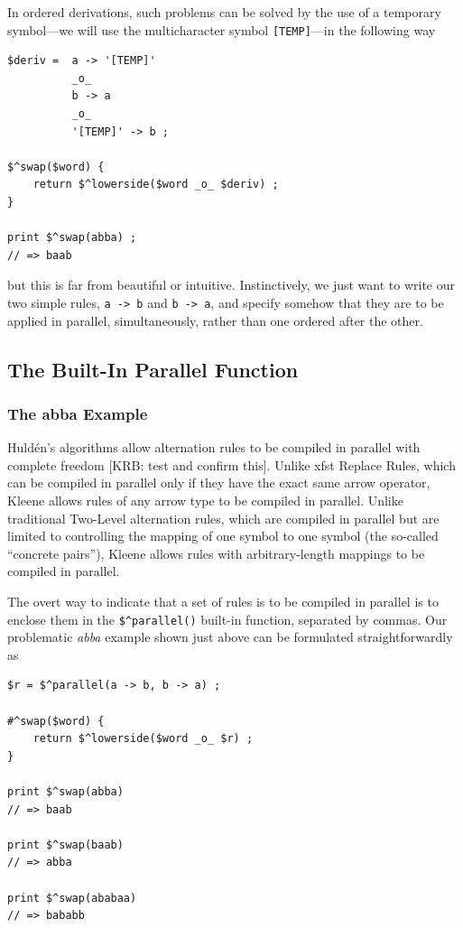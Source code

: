 In ordered derivations, such problems can be solved by the use of a temporary symbol---we
will use the multicharacter symbol \verb![TEMP]!---in the following way


\begin{Verbatim}
$deriv =  a -> '[TEMP]'
          _o_
          b -> a
          _o_
          '[TEMP]' -> b ;

$^swap($word) {
    return $^lowerside($word _o_ $deriv) ;
}

print $^swap(abba) ;
// => baab
\end{Verbatim}

\noindent
but this is far from beautiful or intuitive.  Instinctively, we just want to write our two
simple rules, \verb!a -> b! and \verb!b -> a!, and specify somehow that they are to be
applied in parallel, simultaneously, rather than one ordered after the other.  

\subsection{The Built-In Parallel Function}

\subsubsection{The abba Example}

Huld\'en's algorithms allow alternation rules to be compiled in parallel with complete freedom [KRB:  test and confirm
this].  Unlike xfst Replace Rules, which can be compiled in parallel only if they have the exact same arrow operator,
Kleene allows rules of any arrow type to be compiled in parallel.  Unlike traditional Two-Level alternation rules, which are
compiled in parallel but are
limited to controlling the mapping of one symbol to one symbol (the so-called ``concrete pairs''), Kleene allows
rules with arbitrary-length mappings to be compiled in parallel.

The overt way to indicate that a set of rules is to be compiled in parallel is to enclose them in the \verb!$^parallel()!
built-in function, separated by commas.  Our problematic \emph{abba} example shown just above
can be formulated straightforwardly as

\begin{Verbatim}
$r = $^parallel(a -> b, b -> a) ;

#^swap($word) {
    return $^lowerside($word _o_ $r) ;
}

print $^swap(abba)
// => baab

print $^swap(baab)
// => abba

print $^swap(ababaa)
// => bababb
\end{Verbatim}

